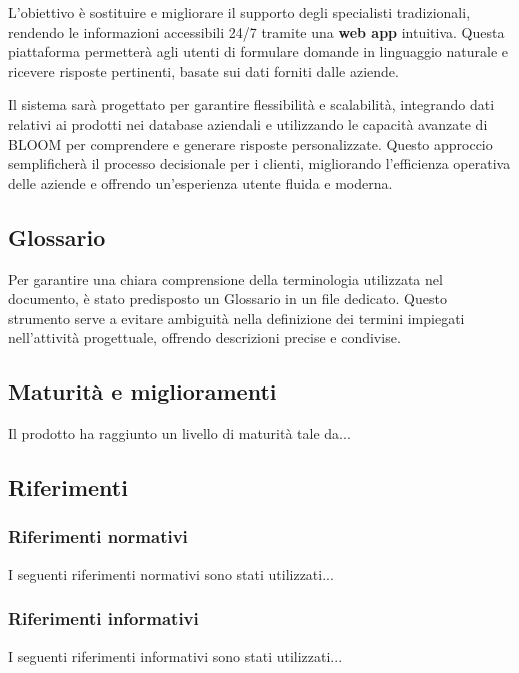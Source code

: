 L’obiettivo è sostituire e migliorare il supporto degli specialisti tradizionali, 
rendendo le informazioni accessibili 24/7 tramite una \textbf{web app} intuitiva. 
Questa piattaforma permetterà agli utenti di formulare domande in linguaggio naturale 
e ricevere risposte pertinenti, basate sui dati forniti dalle aziende. 

Il sistema sarà progettato per garantire flessibilità e scalabilità, 
integrando dati relativi ai prodotti nei database aziendali e utilizzando 
le capacità avanzate di BLOOM per comprendere e generare risposte personalizzate. 
Questo approccio semplificherà il processo decisionale per i clienti, 
migliorando l’efficienza operativa delle aziende e offrendo 
un’esperienza utente fluida e moderna.

\subsection{Glossario}
Per garantire una chiara comprensione della terminologia utilizzata nel documento,
è stato predisposto un Glossario in un file dedicato. Questo strumento 
serve a evitare ambiguità nella definizione dei termini impiegati nell’attività progettuale, 
offrendo descrizioni precise e condivise. 

\subsection{Maturità e miglioramenti}
Il prodotto ha raggiunto un livello di maturità tale da...

\subsection{Riferimenti}

\subsubsection{Riferimenti normativi}
I seguenti riferimenti normativi sono stati utilizzati...

\subsubsection{Riferimenti informativi}
I seguenti riferimenti informativi sono stati utilizzati...
